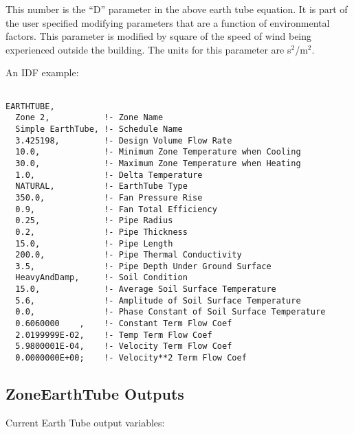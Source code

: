 This number is the ``D'' parameter in the above earth tube equation. It is part of the user specified modifying parameters that are a function of environmental factors. This parameter is modified by square of the speed of wind being experienced outside the building. The units for this parameter are s\(^{2}\)/m\(^{2}\).

An IDF example:

\begin{lstlisting}

EARTHTUBE,
  Zone 2,           !- Zone Name
  Simple EarthTube, !- Schedule Name
  3.425198,         !- Design Volume Flow Rate
  10.0,             !- Minimum Zone Temperature when Cooling
  30.0,             !- Maximum Zone Temperature when Heating
  1.0,              !- Delta Temperature
  NATURAL,          !- EarthTube Type
  350.0,            !- Fan Pressure Rise
  0.9,              !- Fan Total Efficiency
  0.25,             !- Pipe Radius
  0.2,              !- Pipe Thickness
  15.0,             !- Pipe Length
  200.0,            !- Pipe Thermal Conductivity
  3.5,              !- Pipe Depth Under Ground Surface
  HeavyAndDamp,     !- Soil Condition
  15.0,             !- Average Soil Surface Temperature
  5.6,              !- Amplitude of Soil Surface Temperature
  0.0,              !- Phase Constant of Soil Surface Temperature
  0.6060000    ,    !- Constant Term Flow Coef
  2.0199999E-02,    !- Temp Term Flow Coef
  5.9800001E-04,    !- Velocity Term Flow Coef
  0.0000000E+00;    !- Velocity**2 Term Flow Coef
\end{lstlisting}

\subsection{ZoneEarthTube Outputs}\label{zoneearthtube-outputs}

Current Earth Tube output variables:

